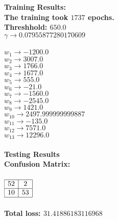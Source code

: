 \begin{enumerate}
\begin{enumerate}
					\bf{Training Results: } \\
						\textnormal{The training took } \(1737\) \textnormal{ epochs. } \\
						\textnormal{Threshhold:} \( 650.0 \) \\
						\( \gamma \rightarrow 0.07955877280170609 \) \\ \\
						\( w_{1} \rightarrow -1200.0 \) \\
						\( w_{2} \rightarrow 3007.0 \) \\
						\( w_{3} \rightarrow 1766.0 \) \\
						\( w_{4} \rightarrow 1677.0 \) \\
						\( w_{5} \rightarrow 555.0 \) \\
						\( w_{6} \rightarrow -21.0 \) \\
						\( w_{7} \rightarrow -1560.0 \) \\
						\( w_{8} \rightarrow -2545.0 \) \\
						\( w_{9} \rightarrow 1421.0 \) \\
						\( w_{10} \rightarrow 2497.999999999887 \) \\
						\( w_{11} \rightarrow -135.0 \) \\
						\( w_{12} \rightarrow 7571.0 \) \\
						\( w_{13} \rightarrow 12296.0 \) \\ \\
					\bf{Testing Results} \\
					\textnormal{Confusion Matrix: } \\ \\
					\( 
						\begin{array}{|c|c|}
							\hline
							52 & 2 \\
							\hline							
							10 & 53 \\
							\hline
						\end{array}
					\) \\ \\
					Total loss: \(31.41886183116968\) \\
				

\end{enumerate}
\end{enumerate}
